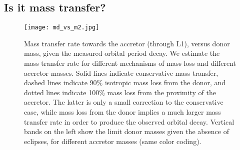 \documentclass[twocolumn]{aastex631}
\begin{document}
\subsection{Is it mass transfer?}
\begin{figure}[ht]
    \centering
    \texttt{[image: md\_vs\_m2.jpg]}
    \caption{Mass transfer rate towards the accretor (through L1), versus donor mass, given the measured orbital period decay.
    We estimate the mass transfer rate for different mechanisms of mass loss and different accretor masses.
    Solid lines indicate conservative mass transfer, dashed lines indicate 90\% isotropic mass loss from the donor, and dotted lines indicate 100\% mass loss from the proximity of the accretor.
    The latter is only a small correction to the conservative case, while mass loss from the donor implies a much larger mass transfer rate in order to produce the observed orbital decay.
    Vertical bands on the left show the limit donor masses given the absence of eclipses, for different accretor masses (same color coding).}
    \label{fig:mdot}
\end{figure}
\end{document}
